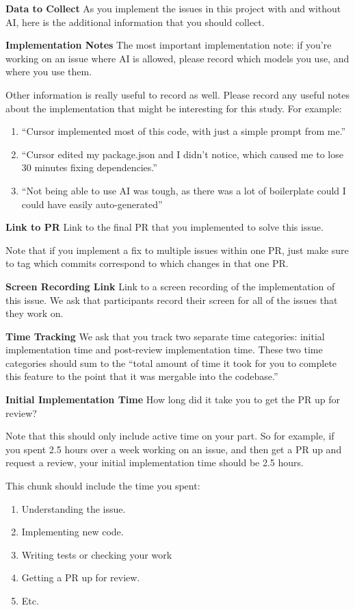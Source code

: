 \documentclass{article}
\begin{document}
\begin{instructionbox}
\textbf{Data to Collect}
As you implement the issues in this project with and without AI, here is the additional information that you should collect.

\textbf{Implementation Notes}
The most important implementation note: if you’re working on an issue where AI is allowed, please record which models you use, and where you use them.

Other information is really useful to record as well. Please record any useful notes about the implementation that might be interesting for this study. For example:
\begin{enumerate}
    \item “Cursor implemented most of this code, with just a simple prompt from me.”
    \item “Cursor edited my package.json and I didn’t notice, which caused me to lose 30 minutes fixing dependencies.”
    \item “Not being able to use AI was tough, as there was a lot of boilerplate could I could have easily auto-generated”
\end{enumerate}

\textbf{Link to PR}
Link to the final PR that you implemented to solve this issue.

Note that if you implement a fix to multiple issues within one PR, just make sure to tag which commits correspond to which changes in that one PR. 


\textbf{Screen Recording Link}
Link to a screen recording of the implementation of this issue. We ask that participants record their screen for all of the issues that they work on.

\textbf{Time Tracking}
We ask that you track two separate time categories: initial implementation time and post-review implementation time. These two time categories should sum to the “total amount of time it took for you to complete this feature to the point that it was mergable into the codebase.”


\textbf{Initial Implementation Time}
How long did it take you to get the PR up for review? 

Note that this should only include active time on your part. So for example, if you spent 2.5 hours over a week working on an issue, and then get a PR up and request a review, your initial implementation time should be 2.5 hours.

This chunk should include the time you spent:
\begin{enumerate}
    \item Understanding the issue.
    \item Implementing new code. 
    \item Writing tests or checking your work
    \item Getting a PR up for review.
    \item Etc.
\end{enumerate}


\end{instructionbox}
\end{document}
